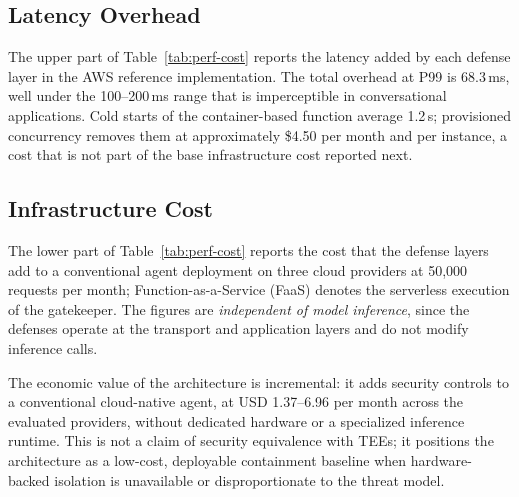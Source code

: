 \subsection{Latency Overhead}

The upper part of Table~\ref{tab:perf-cost} reports the latency added by each defense layer in the AWS reference implementation. The total overhead at P99 is 68.3\,ms, well under the 100--200\,ms range that is imperceptible in conversational applications. Cold starts of the container-based function average 1.2\,s; provisioned concurrency removes them at approximately \$4.50 per month and per instance, a cost that is not part of the base infrastructure cost reported next.

\subsection{Infrastructure Cost}

The lower part of Table~\ref{tab:perf-cost} reports the cost that the defense layers add to a conventional agent deployment on three cloud providers at 50,000 requests per month; Function-as-a-Service (FaaS) denotes the serverless execution of the gatekeeper. The figures are \emph{independent of model inference}, since the defenses operate at the transport and application layers and do not modify inference calls.

The economic value of the architecture is incremental: it adds security controls to a conventional cloud-native agent, at USD 1.37--6.96 per month across the evaluated providers, without dedicated hardware or a specialized inference runtime. This is not a claim of security equivalence with TEEs; it positions the architecture as a low-cost, deployable containment baseline when hardware-backed isolation is unavailable or disproportionate to the threat model.
